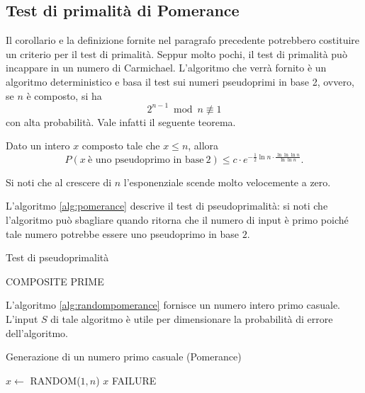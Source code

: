 \subsection{Test di primalità di Pomerance}
Il corollario e la definizione fornite nel paragrafo precedente potrebbero costituire un criterio per il test di primalità. Seppur molto pochi, il test di primalità può incappare in un numero di Carmichael. L'algoritmo che verrà fornito è un algoritmo deterministico e basa il test sui numeri pseudoprimi in base 2, ovvero, se $n$ è composto, si ha
\[
2^{n-1} \bmod n \not\equiv 1
\]
con alta probabilità. Vale infatti il seguente teorema.

\begin{teorema}
Dato un intero $x$ composto tale che $x\leq n$, allora
\[
P(x\ \text{è uno pseudoprimo in base}\ 2) \leq c\cdot e^{-\frac{1}{2}\ln n \cdot \frac{\ln\ln\ln n}{\ln\ln n}}.
\]
\end{teorema}
Si noti che al crescere di $n$ l'esponenziale scende molto velocemente a zero.

L'algoritmo \ref{alg:pomerance} descrive il test di pseudoprimalità: si noti che l'algoritmo può sbagliare quando ritorna che il numero di input è primo poiché tale numero potrebbe essere uno pseudoprimo in base $2$.

\begin{algorithm}
\caption{Test di pseudoprimalità}
\label{alg:pomerance}
\begin{algorithmic}
		\State \Return COMPOSITE 
	\EndIf
	\State \Return PRIME 
\EndFunction
\end{algorithmic}
\end{algorithm}

L'algoritmo \ref{alg:randompomerance} fornisce un numero intero primo casuale. L'input $S$ di tale algoritmo è utile per dimensionare la probabilità di errore dell'algoritmo.

\begin{algorithm}
\caption{Generazione di un numero primo casuale (Pomerance)}
\label{alg:randompomerance}
\begin{algorithmic}
	\Repeat
		\State $x \gets $ RANDOM($1,n$)
			\State \Return $x$
		\EndIf
	\State \Return FAILURE
\EndFunction
\end{algorithmic}
\end{algorithm}

